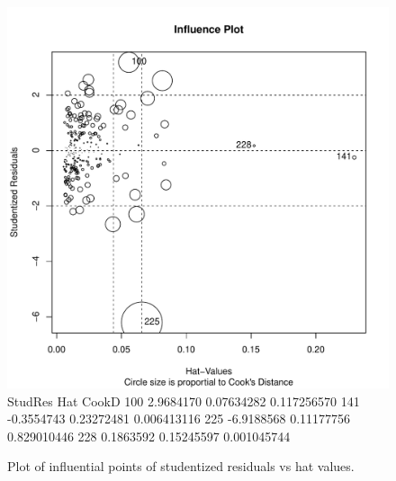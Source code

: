 \documentclass[11pt]{article}\usepackage[]{graphicx}\usepackage[]{color}
\makeatletter
\def\maxwidth{ %
  \ifdim\Gin@nat@width>\linewidth
    \linewidth
  \else
    \Gin@nat@width
  \fi
}
\makeatother
\begin{document}
\begin{figure}[h!] 
\begin{center}

\includegraphics[width=\maxwidth]{figure/unnamed-chunk-13-1} 
       StudRes        Hat       CookD
100  2.9684170 0.07634282 0.117256570
141 -0.3554743 0.23272481 0.006413116
225 -6.9188568 0.11177756 0.829010446
228  0.1863592 0.15245597 0.001045744

\caption{Plot of influential points of studentized residuals vs hat values.}
\label{influential-points}
\end{center} 
\end{figure}
\end{document}
